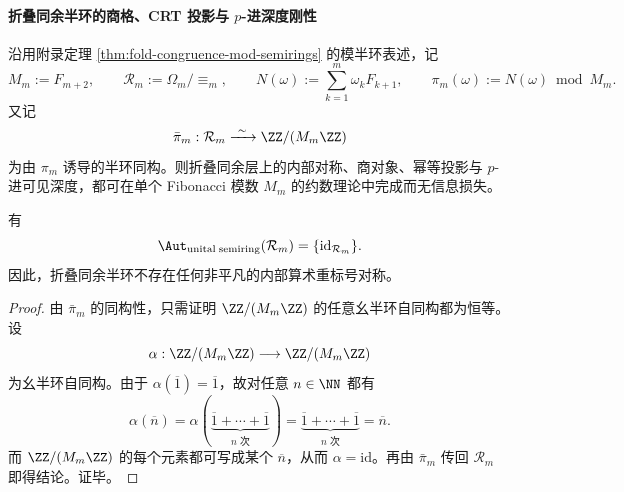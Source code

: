 \paragraph{折叠同余半环的商格、CRT 投影与 \texorpdfstring{$p$}{p}-进深度刚性}
沿用附录定理 \ref{thm:fold-congruence-mod-semirings} 的模半环表述，记
\[
M_m:=F_{m+2},
\qquad
\mathcal R_m:=\Omega_m/\!\equiv_m,
\qquad
N(\omega):=\sum_{k=1}^{m}\omega_kF_{k+1},
\qquad
\pi_m(\omega):=N(\omega)\bmod M_m.
\]
又记
\[
\bar\pi_m:\mathcal R_m\xrightarrow{\ \sim\ }\ZZ/(M_m\ZZ)
\]
为由 \(\pi_m\) 诱导的半环同构。则折叠同余层上的内部对称、商对象、幂等投影与
\(p\)-进可见深度，都可在单个 Fibonacci 模数 \(M_m\) 的约数理论中完成而无信息损失。

\begin{theorem}[折叠同余半环的幺自同构刚性]\label{thm:xi-fold-congruence-unital-automorphism-rigidity}
有
\[
\Aut_{\mathrm{unital\; semiring}}(\mathcal R_m)=\{\mathrm{id}_{\mathcal R_m}\}.
\]
因此，折叠同余半环不存在任何非平凡的内部算术重标号对称。
\end{theorem}
\begin{proof}
由 \(\bar\pi_m\) 的同构性，只需证明 \(\ZZ/(M_m\ZZ)\) 的任意幺半环自同构都为恒等。设
\[
\alpha:\ZZ/(M_m\ZZ)\longrightarrow \ZZ/(M_m\ZZ)
\]
为幺半环自同构。由于 \(\alpha(\overline 1)=\overline 1\)，故对任意 \(n\in\NN\) 都有
\[
\alpha(\overline n)
=
\alpha(\underbrace{\overline 1+\cdots+\overline 1}_{n\text{ 次}})
=
\underbrace{\overline 1+\cdots+\overline 1}_{n\text{ 次}}
=
\overline n.
\]
而 \(\ZZ/(M_m\ZZ)\) 的每个元素都可写成某个 \(\overline n\)，从而 \(\alpha=\mathrm{id}\)。再由 \(\bar\pi_m\) 传回 \(\mathcal R_m\) 即得结论。证毕。
\end{proof}

